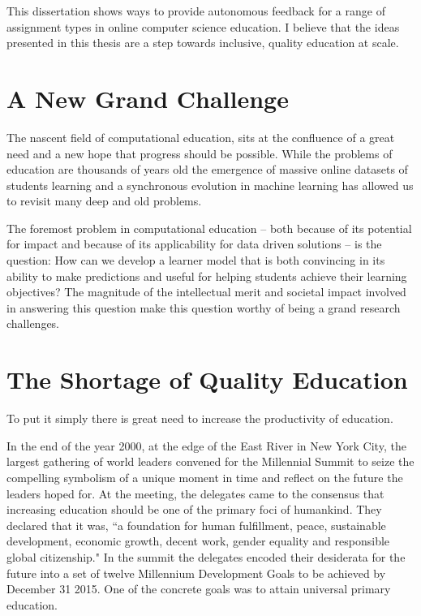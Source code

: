 This dissertation shows ways to provide autonomous feedback for a range of assignment types in online computer science education. I believe that the ideas presented in this thesis are a step towards inclusive, quality education at scale.

\section{A New Grand Challenge}

The nascent field of computational education, sits at the confluence of a great need and a new hope that progress should be possible. While the problems of education are thousands of years old the emergence of massive online datasets of students learning and a synchronous evolution in machine learning has allowed us to revisit many deep and old problems. 

The foremost problem in computational education -- both because of its potential for impact and because of its applicability for data driven solutions -- is the question: How can we develop a learner model that is both convincing in its ability to make predictions and useful for helping students achieve their learning objectives? The magnitude of the intellectual merit and societal impact involved in answering this question make this question worthy of being a grand research challenges.

\section{The Shortage of Quality Education}

To put it simply there is great need to increase the productivity of education.

In the end of the year 2000, at the edge of the East River in New York City, the largest gathering of world leaders convened for the Millennial Summit to seize the compelling symbolism of a unique moment in time and reflect on the future the leaders hoped for. At the meeting, the delegates came to the consensus that increasing education should be one of the primary foci of humankind. They declared that it was, ``a foundation for human fulfillment, peace, sustainable development, economic
growth, decent work, gender equality and responsible global citizenship." In the summit the delegates encoded their desiderata for the future into a set of twelve Millennium Development Goals to be achieved by December 31 2015. One of the concrete goals was to attain universal primary education. 

